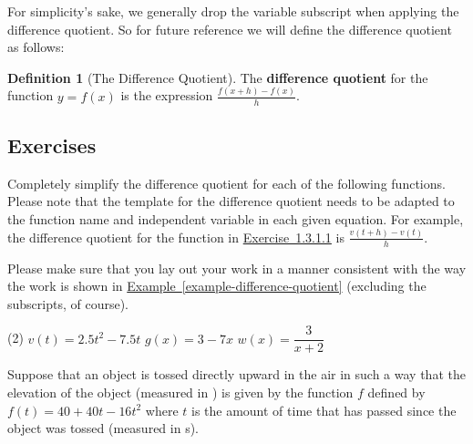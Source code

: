 \documentclass[12pt,]{book}
\newcommand{\terminology}[1]{\textbf{#1}}
\theoremstyle{plain}
\theoremstyle{definition}
\newtheorem{definition}[theorem]{Definition}
\theoremstyle{definition}
\theoremstyle{definition}
\theoremstyle{definition}
\theoremstyle{definition}
\numberwithin{equation}{section}
\newcommand{\fe}[2]{#1\mathopen{}\left(#2\right)\mathclose{}}
\begin{document}
\par
For simplicity's sake, we generally drop the variable subscript when applying the difference quotient. So for future reference we will define the difference quotient as follows:%
\begin{definition}[{The Difference Quotient}]\label{definition-difference-quotient}
The \terminology{difference quotient} for the function \(y=\fe{f}{x}\) is the expression \(\frac{\fe{f}{x+h}-\fe{f}{x}}{h}\).%
\end{definition}
\typeout{************************************************}
\typeout{************************************************}
\subsection[{Exercises}]{Exercises}\label{exercises-3}
\hypertarget{exercisegroup-3}{}\par\noindent Completely simplify the difference quotient for each of the following functions. Please note that the template for the difference quotient needs to be adapted to the function name and independent variable in each given equation. For example, the difference quotient for the function in \hyperlink{exercise-first-difference-quotient}{Exercise~1.3.1.1} is \(\frac{\fe{v}{t+h}-\fe{v}{t}}{h}\).%
\par
Please make sure that you lay out your work in a manner consistent with the way the work is shown in \hyperref[example-difference-quotient]{Example~\ref{example-difference-quotient}} (excluding the subscripts, of course).%
\begin{exercisegroup}(2)
\exercise[1.]\hypertarget{exercise-first-difference-quotient}{}\(\fe{v}{t}=2.5t^2-7.5t\)%
\exercise[2.]\hypertarget{exercise-10}{}\(\fe{g}{x}=3-7x\)%
\exercise[3.]\hypertarget{exercise-11}{}\(\fe{w}{x}=\dfrac{3}{x+2}\)%
\end{exercisegroup}
\par\smallskip\noindent
\hypertarget{exercisegroup-4}{}\par\noindent Suppose that an object is tossed directly upward in the air in such a way that the elevation of the object (measured in \si{\foot}) is given by the function \(f\) defined by \(\fe{f}{t}=40+40t-16t^2\) where \(t\) is the amount of time that has passed since the object was tossed (measured in \si{\second}).%
\end{document}
